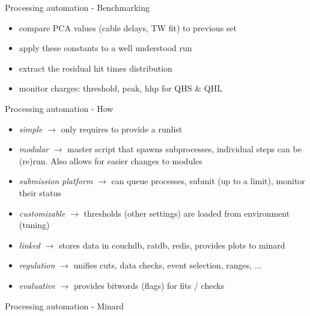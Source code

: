 \documentclass[xcolor=table]{beamer}
\begin{document}
\begin{frame}{Processing automation - Benchmarking}
\begin{itemize}
	\item compare PCA values (cable delays, TW fit) to previous set
	\item apply these constants to a well understood run
	\item extract the residual hit times distribution
	\item monitor charges: threshold, peak, hhp for QHS \& QHL
\end{itemize}
\end{frame}

\begin{frame}{Processing automation - How}
\begin{itemize}
	\item \textit{simple} $\rightarrow$ only requires to provide a runlist
	\item \textit{modular} $\rightarrow$ master script that spawns subprocesses, individual steps can be (re)run. Also allows for easier changes to modules
	\item \textit{submission platform} $\rightarrow$ can queue processes, submit (up to a limit), monitor their status
	\item \textit{customizable} $\rightarrow$ thresholds (other settings) are loaded from environment (tuning)
	\item \textit{linked} $\rightarrow$ stores data in couchdb, ratdb, redis, provides plots to minard
	\item \textit{regulation} $\rightarrow$ unifies cuts, data checks, event selection, ranges, ...
	\item \textit{evaluative} $\rightarrow$ provides bitwords (flags) for fits / checks
\end{itemize}
\end{frame}

\begin{frame}{Processing automation - Minard}
\noindent{}
\end{frame}
\end{document}
